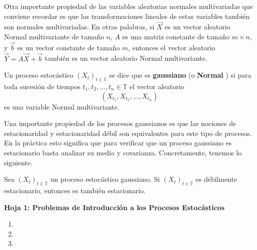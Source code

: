Otra importante propiedad de las variables aleatorias normales multivariadas que conviene recordar es que las transformaciones lineales de estas variables también son normales multivariadas. En otras palabras, si $\vec{X}$ es un vector aleatorio Normal multivariante de tamaño  $n,\,A$ es una matriz constante de tamaño  $m\times n$, y $\vec{b}$ es un vector constante de tamaño  $m$, entonces el vector aleatorio  $\vec{Y}=A\vec{X}+\vec{b}$ también es un vector aleatorio Normal multivariante.
 \begin{definition}
    Un proceso estocástico $(X_t)_{t\in \mathbb{T}}$ se dice que es \textbf{gaussiano} (o \textbf{Normal} )  si para toda sucesión de tiempos $t_1,t_2,\dots,t_n\in \mathbb{T}$ el vector aleatorio \[
        (X_{t_1},X_{t_2},\dots,X_{t_n})
    \] es una variable Normal multivariante.
\end{definition}
Una importante propiedad de los procesos gaussianos es que las nociones de estacionaridad y estacionaridad débil son equivalentes para este tipo de procesos. En la práctica esto significa que para verificar que un proceso gaussiano es estacionario basta analizar su media y covarianza. Concretamente, tenemos lo siguiente.
\begin{theorem}
    Sea $(X_t)_{t\in \mathbb{T}}$ un proceso estocástico gaussiano. Si $(X_{t})_{t\in \mathbb{T}}$ es débilmente estacionario, entonces es también estacionario.
\end{theorem}
\newpage
\begin{center}
    \textbf{\Large Hoja 1: Problemas de Introducción a los Procesos Estocásticos} 
\end{center}
\begin{enumerate}[label=\color{red}\textbf{\arabic*)}]
    \item {}
    \item {}
    \item {} 
\end{enumerate}

